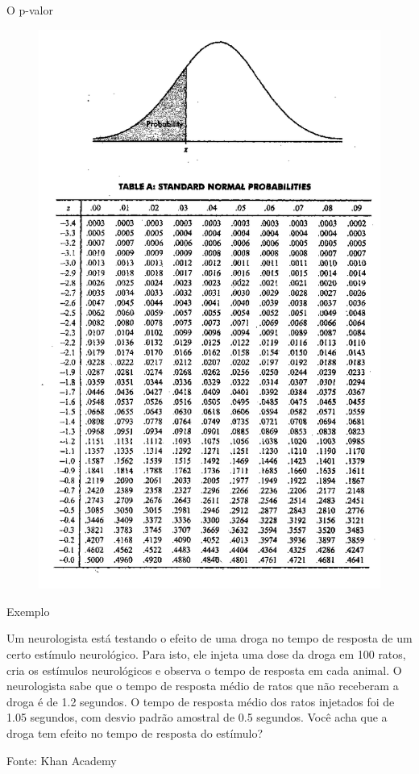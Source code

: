 \documentclass{beamer}
\begin{document}
\begin{frame}{O p-valor}
  \begin{figure}
    \centering
      \includegraphics[height=0.9\textheight]{z_table}
  \end{figure}
\end{frame}
  
\begin{frame}{Exemplo}
  \begin{example}
    Um neurologista está testando o efeito de uma droga no tempo de
    resposta de um certo estímulo neurológico. Para isto, ele injeta
    uma dose da droga em \alert{100} ratos, cria os estímulos
    neurológicos e observa o tempo de resposta em cada animal. O
    neurologista sabe que o tempo de resposta médio de ratos que não
    receberam a droga é de \alert{1.2 segundos}. O tempo de resposta
    médio dos ratos injetados foi de \alert{1.05 segundos}, com desvio
    padrão amostral de \alert{0.5 segundos}. Você acha que a droga tem
    efeito no tempo de resposta do estímulo?
  \end{example}
Fonte: Khan Academy
\end{frame}
\end{document}

